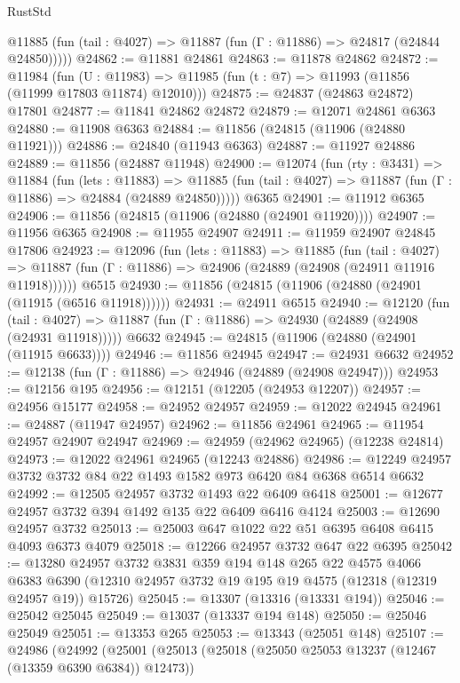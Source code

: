\begin{lexlean}{RustStd}
\begin{coremodule}
      @11885 (fun (tail : @4027) => @11887 (fun (Γ : @11886) => @24817 (@24844 @24850)))))
@24862 := @11881 @24861
@24863 := @11878 @24862
@24872 := @11984
    (fun (U : @11983) => @11985 (fun (t : @7) => @11993 (@11856 (@11999 @17803 @11874) @12010)))
@24875 := @24837 (@24863 @24872) @17801
@24877 := @11841 @24862 @24872
@24879 := @12071 @24861 @6363
@24880 := @11908 @6363
@24884 := @11856 (@24815 (@11906 (@24880 @11921)))
@24886 := @24840 (@11943 @6363)
@24887 := @11927 @24886
@24889 := @11856 (@24887 @11948)
@24900 := @12074
    (fun (rty : @3431) =>
    @11884
      (fun (lets : @11883) =>
      @11885 (fun (tail : @4027) => @11887 (fun (Γ : @11886) => @24884 (@24889 @24850)))))
    @6365
@24901 := @11912 @6365
@24906 := @11856 (@24815 (@11906 (@24880 (@24901 @11920))))
@24907 := @11956 @6365
@24908 := @11955 @24907
@24911 := @11959 @24907 @24845 @17806
@24923 := @12096
    (fun (lets : @11883) =>
    @11885
      (fun (tail : @4027) =>
      @11887 (fun (Γ : @11886) => @24906 (@24889 (@24908 (@24911 @11916 @11918))))))
    @6515
@24930 := @11856 (@24815 (@11906 (@24880 (@24901 (@11915 (@6516 @11918))))))
@24931 := @24911 @6515
@24940 := @12120
    (fun (tail : @4027) => @11887 (fun (Γ : @11886) => @24930 (@24889 (@24908 (@24931 @11918)))))
    @6632
@24945 := @24815 (@11906 (@24880 (@24901 (@11915 @6633))))
@24946 := @11856 @24945
@24947 := @24931 @6632
@24952 := @12138 (fun (Γ : @11886) => @24946 (@24889 (@24908 @24947)))
@24953 := @12156 @195
@24956 := @12151 (@12205 (@24953 @12207))
@24957 := @24956 @15177
@24958 := @24952 @24957
@24959 := @12022 @24945
@24961 := @24887 (@11947 @24957)
@24962 := @11856 @24961
@24965 := @11954 @24957 @24907 @24947
@24969 := @24959 (@24962 @24965) (@12238 @24814)
@24973 := @12022 @24961 @24965 (@12243 @24886)
@24986 := @12249 @24957 @3732 @3732 @84 @22 @1493 @1582 @973 @6420 @84 @6368 @6514 @6632
@24992 := @12505 @24957 @3732 @1493 @22 @6409 @6418
@25001 := @12677 @24957 @3732 @394 @1492 @135 @22 @6409 @6416 @4124
@25003 := @12690 @24957 @3732
@25013 := @25003 @647 @1022 @22 @51 @6395 @6408 @6415 @4093 @6373 @4079
@25018 := @12266 @24957 @3732 @647 @22 @6395
@25042 := @13280
    @24957
    @3732
    @3831
    @359
    @194
    @148
    @265
    @22
    @4575
    @4066
    @6383
    @6390
    (@12310 @24957 @3732 @19 @195 @19 @4575 (@12318 (@12319 @24957 @19)) @15726)
@25045 := @13307 (@13316 (@13331 @194))
@25046 := @25042 @25045
@25049 := @13037 (@13337 @194 @148)
@25050 := @25046 @25049
@25051 := @13353 @265
@25053 := @13343 (@25051 @148)
@25107 := @24986
    (@24992
      (@25001
        (@25013
          (@25018 (@25050 @25053 @13237 (@12467 (@13359 @6390 @6384)) @12473))

\end{coremodule}
\end{lexlean}
